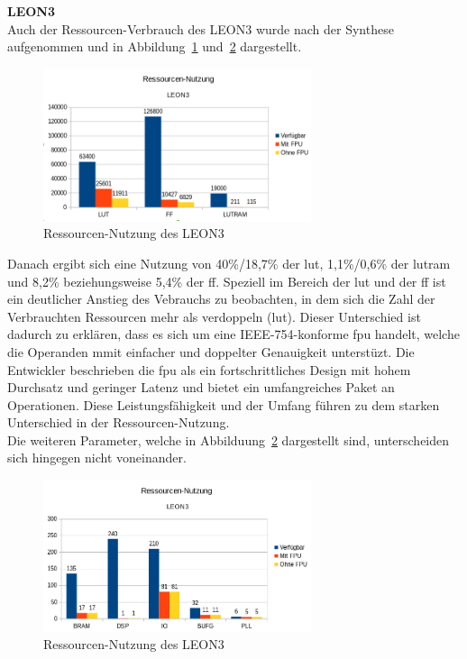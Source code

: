 \textbf{LEON3}\\
Auch der Ressourcen-Verbrauch des LEON3 wurde nach der Synthese aufgenommen und in Abbildung~\ref{fig:ressourcenleon31} und~\ref{fig:ressourcenleon32} dargestellt.\\

\begin{figure}[H]
\centering
\includegraphics[width=0.7\textwidth]{Hauptteil/ressourcennutzungleon31.png}
\caption{Ressourcen-Nutzung des LEON3}
\label{fig:ressourcenleon31}
\end{figure}

Danach ergibt sich eine Nutzung von 40\%/18,7\% der \ac{lut}, 1,1\%/0,6\% der \ac{lutram} und 8,2\% beziehungsweise 5,4\% der \ac{ff}.
Speziell im Bereich der \ac{lut} und der \ac{ff} ist ein deutlicher Anstieg des Vebrauchs zu beobachten, in dem sich die Zahl der Verbrauchten Ressourcen mehr als verdoppeln (\ac{lut}).
Dieser Unterschied ist dadurch zu erklären, dass es sich um eine IEEE-754-konforme \ac{fpu} handelt, welche die Operanden mmit einfacher und doppelter Genauigkeit unterstüzt. Die Entwickler
beschrieben die \ac{fpu} als ein fortschrittliches Design mit hohem Durchsatz und geringer Latenz und bietet ein umfangreiches Paket an Operationen. Diese Leistungsfähigkeit und der Umfang
führen zu dem starken Unterschied in der Ressourcen-Nutzung.\\

\newpage
Die weiteren Parameter, welche in Abbilduung~\ref{fig:ressourcenleon32} dargestellt sind, unterscheiden sich hingegen nicht voneinander.\\

\begin{figure}[H]
\centering
\includegraphics[width=0.7\textwidth]{Hauptteil/ressourcenleon32.png}
\caption{Ressourcen-Nutzung des LEON3}
\label{fig:ressourcenleon32}
\end{figure}

